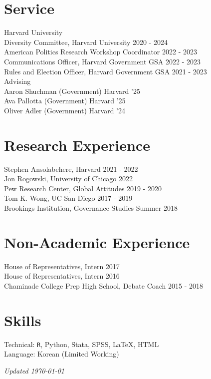 \documentclass[margin, line]{res}
\begin{document}
\begin{resume}
\section{Service}
Harvard University\\
\hspace*{5mm} Diversity Committee, Harvard University \hfill 2020 - 2024\\
\hspace*{5mm} American Politics Research Workshop Coordinator \hfill 2022 - 2023\\
\hspace*{5mm} Communications Officer, Harvard Government GSA \hfill 2022 - 2023\\
\hspace*{5mm} Rules and Election Officer, Harvard Government GSA \hfill 2021 - 2023\\
\hspace*{2.5mm} Advising \\
\hspace*{5mm} Aaron Shuchman (Government) \hfill Harvard '25\\
\hspace*{5mm} Ava Pallotta (Government) \hfill Harvard '25\\
\hspace*{5mm} Oliver Adler (Government) \hfill Harvard '24

\section{Research Experience}
Stephen Ansolabehere, Harvard \hfill 2021 - 2022\\
Jon Rogowski, University of Chicago \hfill 2022\\
Pew Research Center, Global Attitudes \hfill 2019 - 2020\\
Tom K. Wong, UC San Diego \hfill 2017 - 2019\\
Brookings Institution, Governance Studies \hfill Summer 2018

\section{Non-Academic Experience}
House of Representatives, Intern \hfill 2017\\
House of Representatives, Intern \hfill 2016\\
Chaminade College Prep High School, Debate Coach \hfill 2015 - 2018

\section{Skills}
Technical: \texttt{R}, Python, Stata, SPSS, \LaTeX, HTML\\
Language: Korean (Limited Working)

\vspace*{\fill}

\hfill \small{\textit{Updated \today}}

\end{resume}
\end{document}
